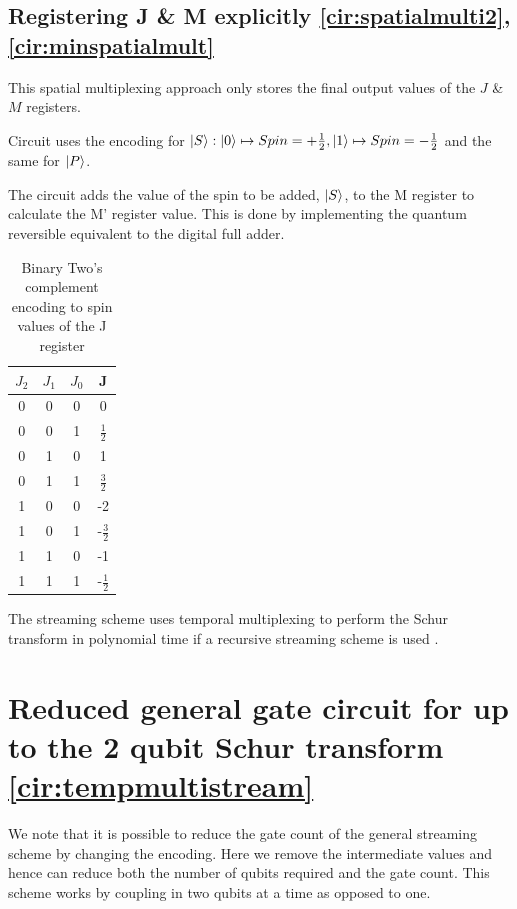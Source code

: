 \documentclass[12pt]{article}
\begin{document}
\subsection{Registering J \& M explicitly \autoref{cir:spatialmulti2}, \autoref{cir:minspatialmult}}

This spatial multiplexing approach only stores the final output values of the $J$ \& $M$ registers. 

Circuit uses the encoding for $\left\vert{S}\right\rangle : \left\vert{0}\right\rangle \mapsto Spin = +\frac{1}{2}, \left\vert{1}\right\rangle \mapsto Spin = -\frac{1}{2}$ and the same for $\left\vert{P}\right\rangle$. 

The circuit adds the value of the spin to be added, $\left\vert{S}\right\rangle$, to the M register to calculate the M' register value. This is done by implementing the quantum reversible equivalent to the digital full adder. 

\begin{table}
\begin{tabular}{ |c c c|c| }
\hline
 $J_2$ &$J_1$ &$J_0$ &J \\
 \hline
 0 &0 &0 &0 \\ 
 0 &0 &1 &$\frac{1}{2}$ \\ 
 0 &1 &0 &1 \\ 
 0 &1 &1 &$\frac{3}{2}$ \\ 
 \hline 
 1 &0 &0 &-2 \\ 
 1 &0 &1 &-$\frac{3}{2}$ \\ 
 1 &1 &0 &-1 \\ 
 1 &1 &1 &-$\frac{1}{2}$ \\  
 \hline 
\end{tabular}
\caption{Binary Two's complement encoding to spin values of the J register}
\label{tab:encoding}
\vspace{-110pt}
\end{table}

The streaming scheme uses temporal multiplexing to perform the Schur transform in polynomial time if a recursive streaming scheme is used \cite{bacon2007quantum}.

\section{Reduced general gate circuit for up to the 2 qubit Schur transform \autoref{cir:tempmultistream}}

We note that it is possible to reduce the gate count of the general streaming scheme by changing the encoding. Here we remove the intermediate values and hence can reduce both the number of qubits required and the gate count. This scheme works by coupling in two qubits at a time as opposed to one.
\end{document}
